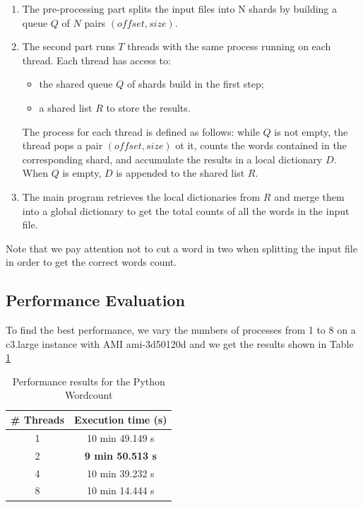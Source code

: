 \documentclass{article}
\begin{document}
\begin{enumerate}
  \item{The pre-processing part splits the input files into N shards by building a queue $Q$ of $N$ pairs $(offset, size)$.}
  \item{The second part runs $T$ threads with the same process running on each thread. Each thread has access to:
    \begin{itemize}
      \item{the shared queue $Q$ of shards build in the first step;}
      \item{a shared list $R$ to store the results.}
    \end{itemize}
 The process for each thread is defined as follows: while $Q$ is not empty, the thread pops a pair $(offset, size)$ ot it, counts the words contained in the corresponding shard, and accumulate the results in a local dictionary $D$. When $Q$ is empty, $D$ is appended to the shared list $R$.}
 \item{The main program retrieves the local dictionaries from $R$ and merge them into a global dictionary to get the total counts of all the words in the input file.}
\end{enumerate}

Note that we pay attention not to cut a word in two when splitting the input file in order to get the correct words count.

\subsection{Performance Evaluation}
To find the best performance, we vary the numbers of processes from 1 to 8 on a c3.large instance with AMI ami-3d50120d and we get the results shown in Table \ref{table:python-threads-performance}

\begin{table}[h!]
  \centering
  \begin{tabular}{|c|c|}
    \hline
    \textbf{\# Threads} & \textbf{Execution time (s)} \\
    \hline
    1 & 10 min 49.149 s \\
    \hline
    2 & \textbf{9 min 50.513 s} \\
    \hline
    4 & 10 min 39.232 s \\
    \hline
    8 & 10 min 14.444 s \\
    \hline
  \end{tabular}
  \label{table:python-threads-performance}
  \caption{Performance results for the Python Wordcount}
\end{table}
\end{document}
